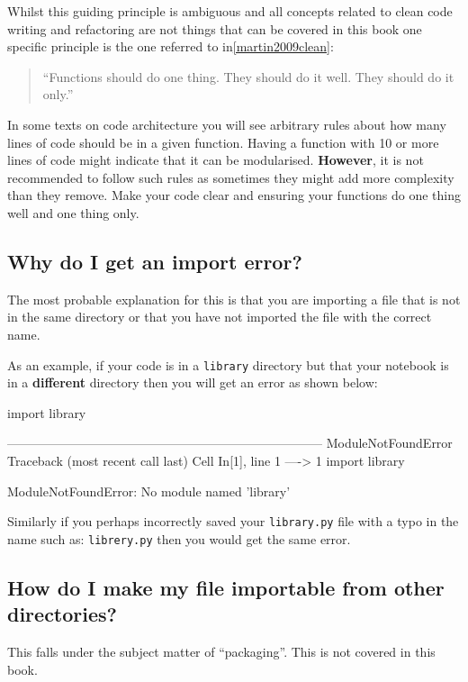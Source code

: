 Whilst this guiding principle is ambiguous and all concepts related to clean
code writing and refactoring are not things that can be covered in this book one
specific principle is the one referred to in\ref{martin2009clean}:

\begin{quote}
``Functions should do one thing. They should do it well. They should do it
only.''
\end{quote}



In some texts on code architecture you will see arbitrary rules about how many
lines of code should be in a given function. Having a function with 10 or more
lines of code might indicate that it can be modularised. \textbf{However}, it is
not
recommended to follow such rules as sometimes they might add more complexity than
they remove. Make your code clear and
ensuring your functions do one thing well and one thing only.


\subsection{Why do I get an import error?}
\label{\detokenize{building-tools/05-modularisation/why/main:why-do-i-get-an-import-error}}

The most probable explanation for this is that you are importing a file that is
not in the same directory or that you have not imported the file with the
correct name.


As an example, if your code is in a \texttt{library} directory but that your
notebook is in a \textbf{different} directory then you will get an error as shown
below:

\begin{pyin}
import library
\end{pyin}





\begin{raw}
---------------------------------------------------------------------------
ModuleNotFoundError                       Traceback (most recent call last)
Cell In[1], line 1
----> 1 import library

ModuleNotFoundError: No module named 'library'
\end{raw}






Similarly if you perhaps incorrectly saved your \texttt{library.py} file with a typo in
the name such as: \texttt{librery.py} then you would get the same error.


\subsection{How do I make my file importable from other directories?}
\label{\detokenize{building-tools/05-modularisation/why/main:how-do-i-make-my-file-importable-from-other-directories}}

This falls under the subject matter of ``packaging''. This is not covered in
this book.
